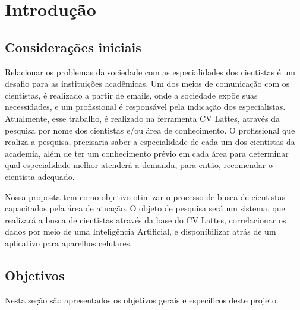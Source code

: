 \chapter{Introdução}\label{cap:introducao}


\section{Considerações iniciais}\label{sec:consideracoesIniciais}

Relacionar os problemas da sociedade com as especialidades dos cientistas é um desafio para as instituições acadêmicas. Um dos meios de comunicação com os cientistas, é realizado a partir de emails, onde a sociedade expõe suas necessidades, e um profissional é responsável pela indicação dos especialistas. Atualmente, esse trabalho, é realizado na ferramenta CV Lattes, através da pesquisa por nome dos cientistas e/ou área de conhecimento. O profissional que realiza a pesquisa, precisaria saber a especialidade de cada um dos cientistas da academia, além de ter um conhecimento prévio em cada área para determinar qual especialidade melhor atenderá a demanda, para então, recomendar o cientista adequado.

Nossa proposta tem como objetivo otimizar o processo de busca de cientistas capacitados pela área de atuação. O objeto de pesquisa será um sistema, que realizará a busca de cientistas através da base do CV Lattes, correlacionar os dados por meio de uma Inteligência Artificial, e disponíbilizar atrás de um aplicativo para aparelhos celulares.

\section{Objetivos}\label{sec:objetivos}

Nesta seção são apresentados os objetivos gerais e específicos deste projeto.

